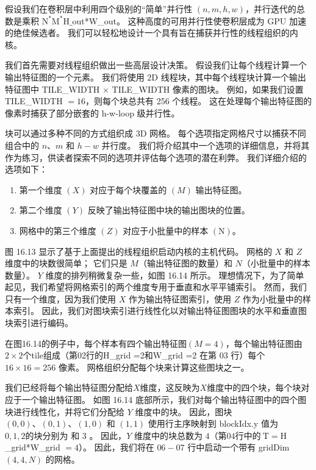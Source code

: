 假设我们在卷积层中利用四个级别的“简单”并行性 $(n, m, h, w)$，并行迭代的总数是乘积 $\mathrm{N}^{*} \mathrm{ M}^{*} \mathrm{H} \_$out*W\_out。 这种高度的可用并行性使卷积层成为 GPU 加速的绝佳候选者。 我们可以轻松地设计一个具有旨在捕获并行性的线程组织的内核。

我们首先需要对线程组织做出一些高层设计决策。 假设我们让每个线程计算一个输出特征图的一个元素。 我们将使用 2D 线程块，其中每个线程块计算一个输出特征图中 TILE\_WIDTH $\times$ TILE\_WIDTH 像素的图块。 例如，如果我们设置 TILE\_WIDTH $=16$，则每个块总共有 256 个线程。 这在处理每个输出特征图的像素时捕获了部分嵌套的 h-w-loop 级并行性。

块可以通过多种不同的方式组织成 3D 网格。 每个选项指定网格尺寸以捕获不同组合中的 $n、m$ 和 $h-w$ 并行度。 我们将介绍其中一个选项的详细信息，并将其作为练习，供读者探索不同的选项并评估每个选项的潜在利弊。 我们详细介绍的选项如下：

\begin{enumerate}
   \item 第一个维度 $(X)$ 对应于每个块覆盖的 $(M)$ 输出特征图。

   \item 第二个维度 $(Y)$ 反映了输出特征图中块的输出图块的位置。

   \item 网格中的第三个维度 $(Z)$ 对应于小批量中的样本 $(\mathrm{N})$。
\end{enumerate}

图 16.13 显示了基于上面提出的线程组织启动内核的主机代码。 网格的 $X$ 和 $Z$ 维度中的块数很简单； 它们只是 $M$（输出特征图的数量）和 $N$（小批量中的样本数量）。 $Y$ 维度的排列稍微复杂一些，如图 16.14 所示。 理想情况下，为了简单起见，我们希望将网格索引的两个维度专用于垂直和水平平铺索引。 然而，我们只有一个维度，因为我们使用 $X$ 作为输出特征图索引，使用 $Z$ 作为小批量中的样本索引。 因此，我们对图块索引进行线性化以对输出特征图图块的水平和垂直图块索引进行编码。

在图16.14的例子中，每个样本有四个输出特征图$(M=4)$，每个输出特征图由$2 \times 2$个tile组成（第02行的H\_grid =2和W\_grid =2 在第 03 行）每个 $16 \times 16=256$ 像素。 网格组织分配每个块来计算这些图块之一。

我们已经将每个输出特征图分配给$X$维度，这反映为$X$维度中的四个块，每个块对应于一个输出特征图。 如图 16.14 底部所示，我们对每个输出特征图中的四个图块进行线性化，并将它们分配给 $Y$ 维度中的块。 因此，图块 $(0,0)、(0,1)、(1,0)$ 和 $(1,1)$ 使用行主序映射到 blockIdx.y 值为 $0,1,2 的块 分别为 $ 和 3 。 因此，$Y$ 维度中的块总数为 $4（第 04 行中的 \mathrm{~T}=\mathrm{H}$ \_grid*W\_grid $=4$）。 因此，我们将在 $06-07$ 行中启动一个带有 gridDim $(4,4, N)$ 的网格。

